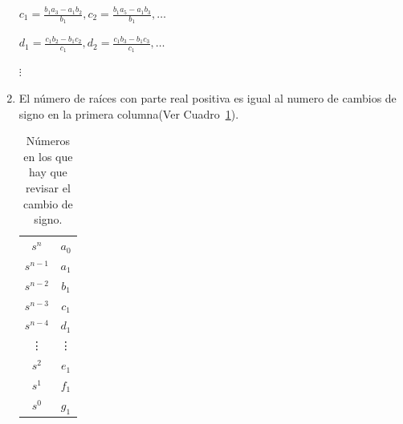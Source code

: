 \begin{enumerate}
            \begin{math}
            c_1 = \frac{b_1 a_3 - a_1 b_2}{b_1} , c_2 = \frac{b_1 a_5 - a_1 b_3}{b_1} , \dots
            \end{math}

            \begin{math}
            d_1 = \frac{c_1 b_2 - b_1 c_2}{c_1} , d_2 = \frac{c_1 b_3 - b_1 c_3}{c_1} , \dots
            \end{math}

            \begin{math}
            \vdots
            \end{math}

            \item El número de raíces con parte real positiva es igual al numero de cambios de signo en la primera columna(Ver Cuadro~\ref{tab:Numeros}).

            \begin{table}[htbp]
                \centering
                \begin{tabular}{c|c|}
                $s^n$     & $a_0$ \\
                $s^{n-1}$ & $a_1$ \\
                $s^{n-2}$ & $b_1$ \\
                $s^{n-3}$ & $c_1$ \\
                $s^{n-4}$ & $d_1$ \\
                \vdots & \vdots   \\
                $s^2$ & $e_1$     \\
                $s^1$ & $f_1$     \\
                $s^0$ & $g_1$
                \end{tabular}
            \caption{\label{tab:Numeros}Números en los que hay que revisar el cambio de signo.}
            \end{table}

        \end{enumerate}

    \newpage
